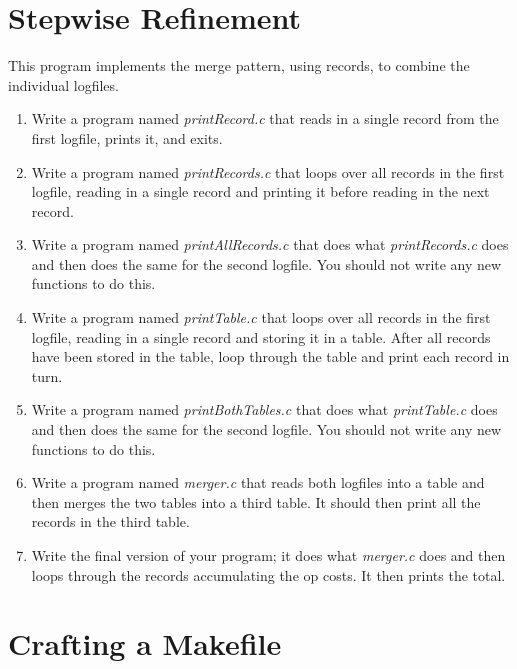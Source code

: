 \documentclass{article}
\begin{document}
\section*{Stepwise Refinement}

This program implements the merge pattern, using records, to combine the
individual logfiles.

\begin{enumerate}
\item
    Write a program named {\it printRecord.c} that reads in a single
record from the first logfile, prints it, and exits.

\item
Write a program named {\it printRecords.c} that loops over all
records in the first logfile, reading in a single record and printing
it before reading in the next record.

\item
Write a program named {\it printAllRecords.c} that does what 
{\it printRecords.c} does and then
does the same for
the second logfile.
You should not write any new functions
to do this.

\item
Write a program named {\it printTable.c} that loops over all
records in the first logfile, reading in a single record and storing
it in a table. After all records have been stored in the table,
loop through the table and print each record in turn.

\item
Write a program named {\it printBothTables.c}
that does what {\it printTable.c}
does and then does the same for the second logfile.
You should not write any new functions
to do this.

\item
Write a program named {\it merger.c} that reads both logfiles into a
table and then merges the two tables into a third table. It should then
print all the records in the third table.

\item
Write the final version of your program; it does what {\it merger.c} does
and then loops through the records accumulating the op costs. It then
prints the total.

\end{enumerate}

\section*{Crafting a Makefile}
\end{document}
